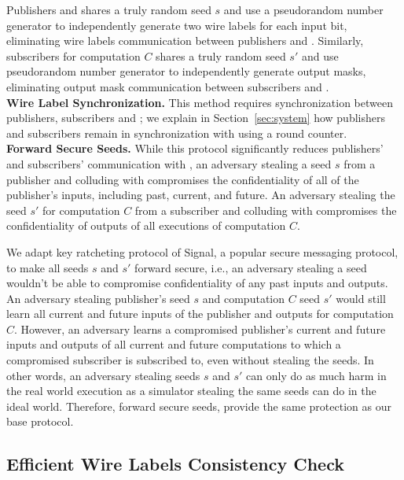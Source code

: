 Publishers and \garbler shares a truly random seed $s$ and use a pseudorandom
number generator to independently generate two wire labels for each input bit,
eliminating wire labels communication between publishers and \garbler.
Similarly, subscribers for computation $C$ shares a truly random seed $s'$ and
use pseudorandom number generator to independently generate output masks,
eliminating output mask communication between subscribers and \garbler.\\[6pt] 

\noindent\textbf{Wire Label Synchronization.} This method requires
synchronization between publishers, subscribers and \garbler; we explain in
Section~\ref{sec:system} how publishers and subscribers remain in
synchronization with \garbler using a round counter.\\[6pt]

\noindent\textbf{Forward Secure Seeds.} While this protocol significantly
reduces publishers' and subscribers' communication with \garbler, an adversary
stealing a seed $s$ from a publisher and colluding with \broker compromises the
confidentiality of all of the publisher's inputs, including past, current, and
future.  An adversary stealing the seed $s'$ for computation $C$ from a
subscriber and colluding with \broker compromises the confidentiality of
outputs of all executions of computation $C$.

We adapt key ratcheting protocol of Signal, a popular secure messaging
protocol, to make all seeds $s$ and $s'$ forward secure, i.e., an adversary
stealing a seed wouldn't be able to compromise confidentiality of any past
inputs and outputs. An adversary stealing publisher's seed $s$ and computation
$C$ seed $s'$ would still learn all current and future inputs of the publisher
and outputs for computation $C$.  However, an adversary learns a compromised
publisher's current and future inputs and outputs of all current and future
computations to which a compromised subscriber is subscribed to, even without
stealing the seeds. In other words, an adversary stealing seeds $s$ and $s'$
can only do as much harm in the real world execution as a simulator stealing
the same seeds can do in the ideal world.  Therefore, forward secure seeds,
provide the same protection as our base protocol.

\subsection{Efficient Wire Labels Consistency Check} 

